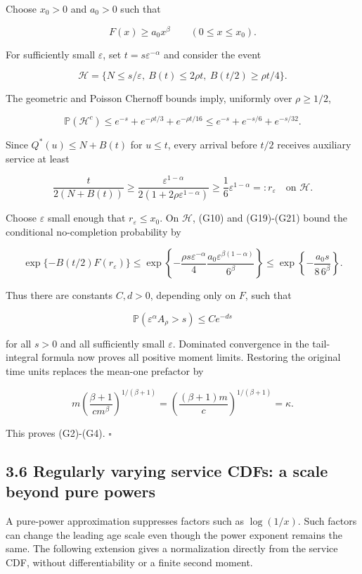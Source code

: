\documentclass[
  11pt,
  a4paper,
]{scrartcl}
\begin{document}
Choose \(x_0>0\) and \(a_0>0\) such that

\[
F(x)\geq a_0x^\beta\qquad(0\leq x\leq x_0).
\tag{G19}
\]

For sufficiently small \(\varepsilon\), set \(t=s\varepsilon^{-\alpha}\)
and consider the event

\[
\mathcal H=\{N\leq s/\varepsilon,\ B(t)\leq2\rho t,
\ B(t/2)\geq\rho t/4\}.
\]

The geometric and Poisson Chernoff bounds imply, uniformly over
\(\rho\geq1/2\),

\[
\mathbb P(\mathcal H^c)
\leq e^{-s}+e^{-\rho t/3}+e^{-\rho t/16}
\leq e^{-s}+e^{-s/6}+e^{-s/32}.
\tag{G20}
\]

Since \(Q^*(u)\leq N+B(t)\) for \(u\leq t\), every arrival before
\(t/2\) receives auxiliary service at least

\[
\frac{t}{2(N+B(t))}
\geq\frac{\varepsilon^{1-\alpha}}{2(1+2\rho\varepsilon^{1-\alpha})}
\geq\frac16\varepsilon^{1-\alpha}=:r_\varepsilon
\quad\text{on }\mathcal H.
\tag{G21}
\]

Choose \(\varepsilon\) small enough that \(r_\varepsilon\leq x_0\). On
\(\mathcal H\), (G10) and (G19)-(G21) bound the conditional
no-completion probability by

\[
\exp\{-B(t/2)F(r_\varepsilon)\}
\leq\exp\left\{-\frac{\rho s\varepsilon^{-\alpha}}4
\frac{a_0\varepsilon^{\beta(1-\alpha)}}{6^\beta}\right\}
\leq\exp\left\{-\frac{a_0s}{8\,6^\beta}\right\}.
\tag{G22}
\]

Thus there are constants \(C,d>0\), depending only on \(F\), such that

\[
\mathbb P(\varepsilon^\alpha A_\rho>s)\leq C e^{-ds}
\tag{G23}
\]

for all \(s>0\) and all sufficiently small \(\varepsilon\). Dominated
convergence in the tail-integral formula now proves all positive moment
limits. Restoring the original time units replaces the mean-one
prefactor by

\[
m\left(\frac{\beta+1}{c m^\beta}\right)^{1/(\beta+1)}
=\left(\frac{(\beta+1)m}{c}\right)^{1/(\beta+1)}=\kappa.
\]

This proves (G2)-(G4). \(\square\)

\subsection{3.6 Regularly varying service CDFs: a scale beyond pure
powers}\label{regularly-varying-service-cdfs-a-scale-beyond-pure-powers}

A pure-power approximation suppresses factors such as \(\log(1/x)\).
Such factors can change the leading age scale even though the power
exponent remains the same. The following extension gives a normalization
directly from the service CDF, without differentiability or a finite
second moment.
\end{document}
